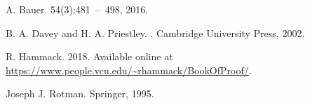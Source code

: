 \documentclass[french,course,oneside,theoremnosection]{lecture}
\begin{document}
\begin{thebibliography}{99}
\newblock A. Bauer.
 54(3):481~--~498, 2016.


\newblock B. A. Davey and H. A. Priestley. 
.
\newblock Cambridge University Press, 2002.

\newblock R. Hammack.
 2018. Available online at \url{https://www.people.vcu.edu/~rhammack/BookOfProof/}.

\newblock Joseph J. Rotman.
 Springer, 1995.

%
%
%
%
\end{thebibliography}
\end{document}
